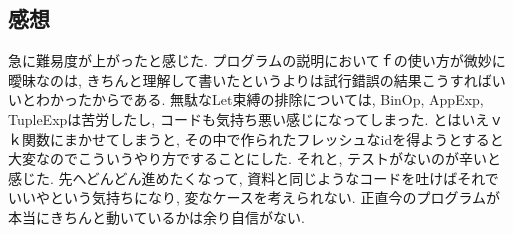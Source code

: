 \documentclass{jarticle}
\begin{document}
\subsection{感想}
急に難易度が上がったと感じた. プログラムの説明においてｆの使い方が微妙に曖昧なのは, きちんと理解して書いたというよりは試行錯誤の結果こうすればいいとわかったからである. 無駄なLet束縛の排除については, BinOp, AppExp, TupleExpは苦労したし, コードも気持ち悪い感じになってしまった. とはいえｖｋ関数にまかせてしまうと, その中で作られたフレッシュなidを得ようとすると大変なのでこういうやり方ですることにした. それと, テストがないのが辛いと感じた. 先へどんどん進めたくなって, 資料と同じようなコードを吐けばそれでいいやという気持ちになり, 変なケースを考えられない. 正直今のプログラムが本当にきちんと動いているかは余り自信がない.
\end{document}
